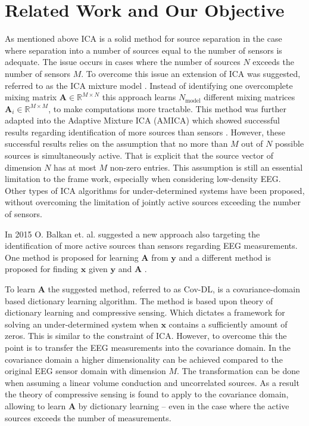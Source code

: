 \section{Related Work and Our Objective} 
As mentioned above ICA is a solid method for source separation in the case where separation into a number of sources equal to the number of sensors is adequate. The issue occurs in cases where the number of sources $N$ exceeds the number of sensors $M$.  
To overcome this issue an extension of ICA was suggested, referred to as the ICA mixture model \cite{Balkan2015}.
Instead of identifying one overcomplete mixing matrix $\mathbf{A} \in \mathbb{R}^{M \times N}$ this approach learns $N_{\text{model}}$ different mixing matrices $\mathbf{A}_i \in \mathbb{R}^{M\times M}$, to make computations more tractable. 
This method was further adapted into the Adaptive Mixture ICA (AMICA) which showed successful results regarding identification of more sources than sensors \cite{Palmer2008}. 
However, these successful results relies on the assumption that no more than $M$ out of $N$ possible sources is simultaneously active. That is explicit that the source vector of dimension $N$ has at most $M$ non-zero entries.
This assumption is still an essential limitation to the frame work, especially when considering low-density EEG. 
Other types of ICA algorithms for under-determined systems have been proposed, without overcoming the limitation of jointly active sources exceeding the number of sensors.

In 2015 O. Balkan et. al. suggested a new approach also targeting the identification of more active sources than sensors regarding EEG measurements. One method is proposed for learning $\textbf{A}$ from $\textbf{y}$ \cite{Balkan2015} and a different method is proposed for finding $\textbf{x}$ given $\textbf{y}$ and $\textbf{A}$ \cite{Balkan2014}.

To learn $\textbf{A}$ the suggested method, referred to as Cov-DL, is a covariance-domain based dictionary learning algorithm. 
The method is based upon theory of dictionary learning and compressive sensing. Which dictates a framework for solving an under-determined system when $\textbf{x}$ contains a sufficiently amount of zeros. 
This is similar to the constraint of ICA.  However, to overcome this the point is to transfer the EEG measurements into the covariance domain. In the covariance domain a higher dimensionality can be achieved compared to the original EEG sensor domain with dimension $M$.
The transformation can be done when assuming a linear volume conduction and uncorrelated sources.
As a result the theory of compressive sensing is found to  apply to the covariance domain, allowing to learn $\textbf{A}$ by dictionary learning -- even in the case where the active sources exceeds the number of measurements.

